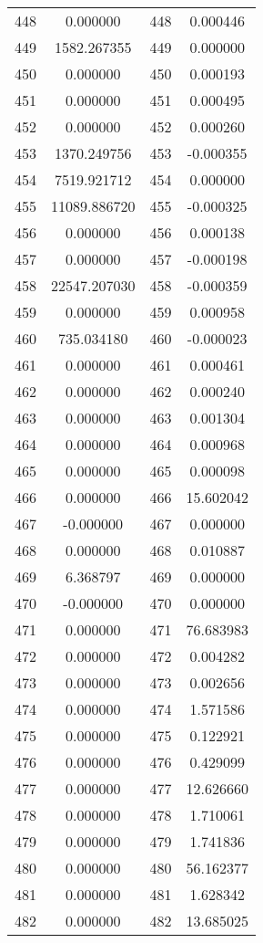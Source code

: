 \documentclass[12pt]{article}
\begin{document}
\begin{longtable}{@{}cccc@{}}
448 & 0.000000 & 448 & 0.000446 \\
449 & 1582.267355 & 449 & 0.000000 \\
450 & 0.000000 & 450 & 0.000193 \\
451 & 0.000000 & 451 & 0.000495 \\
452 & 0.000000 & 452 & 0.000260 \\
453 & 1370.249756 & 453 & -0.000355 \\
454 & 7519.921712 & 454 & 0.000000 \\
455 & 11089.886720 & 455 & -0.000325 \\
456 & 0.000000 & 456 & 0.000138 \\
457 & 0.000000 & 457 & -0.000198 \\
458 & 22547.207030 & 458 & -0.000359 \\
459 & 0.000000 & 459 & 0.000958 \\
460 & 735.034180 & 460 & -0.000023 \\
461 & 0.000000 & 461 & 0.000461 \\
462 & 0.000000 & 462 & 0.000240 \\
463 & 0.000000 & 463 & 0.001304 \\
464 & 0.000000 & 464 & 0.000968 \\
465 & 0.000000 & 465 & 0.000098 \\
466 & 0.000000 & 466 & 15.602042 \\
467 & -0.000000 & 467 & 0.000000 \\
468 & 0.000000 & 468 & 0.010887 \\
469 & 6.368797 & 469 & 0.000000 \\
470 & -0.000000 & 470 & 0.000000 \\
471 & 0.000000 & 471 & 76.683983 \\
472 & 0.000000 & 472 & 0.004282 \\
473 & 0.000000 & 473 & 0.002656 \\
474 & 0.000000 & 474 & 1.571586 \\
475 & 0.000000 & 475 & 0.122921 \\
476 & 0.000000 & 476 & 0.429099 \\
477 & 0.000000 & 477 & 12.626660 \\
478 & 0.000000 & 478 & 1.710061 \\
479 & 0.000000 & 479 & 1.741836 \\
480 & 0.000000 & 480 & 56.162377 \\
481 & 0.000000 & 481 & 1.628342 \\
482 & 0.000000 & 482 & 13.685025 \\

\end{longtable}
\end{document}
